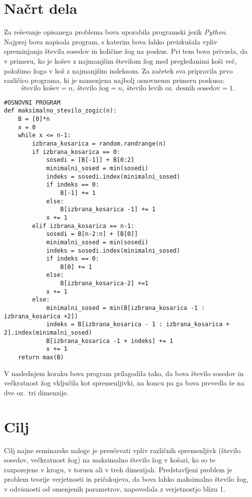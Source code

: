 \documentclass[a4paper, 11pt]{article}
\begin{document}
\section{Načrt dela}
Za reševanje opisanega problema bova uporabila programski jezik \emph{Python}. Najprej bova napisala program, s katerim bova
lahko preizkušala vpliv spreminjanja števila sosedov in količine žog na poskus. Pri tem bova privzela, da v primeru, ko je  
košev z najmanjšim številom žog med pregledanimi koši več, položimo žogo v koš z najmanjšim indeksom. Za začetek sva
pripravila prvo različico programa, ki je namenjena najbolj osnovnemu primeru poskusa:
$$ \text{število košev} = n,\  \text{število žog} = n, \ \text{število levih oz.\ desnih sosedov} = 1 .$$

\pagebreak

\begin{verbatim}
#OSNOVNI PROGRAM
def maksimalno_stevilo_zogic(n):
    B = [0]*n
    x = 0
    while x <= n-1:
        izbrana_kosarica = random.randrange(n)
        if izbrana_kosarica == 0:
            sosedi = [B[-1]] + B[0:2]
            minimalni_sosed = min(sosedi)
            indeks = sosedi.index(minimalni_sosed)
            if indeks == 0:
                B[-1] += 1
            else:
                B[izbrana_kosarica -1] += 1
            x += 1
        elif izbrana_kosarica == n-1:
            sosedi = B[n-2:n] + [B[0]]
            minimalni_sosed = min(sosedi)
            indeks = sosedi.index(minimalni_sosed)
            if indeks == 0:
                B[0] += 1
            else:
                B[izbrana_kosarica-2] +=1
            x += 1
        else:
            minimalni_sosed = min(B[izbrana_kosarica -1 : izbrana_kosarica +2])
            indeks = B[izbrana_kosarica - 1 : izbrana_kosarica + 2].index(minimalni_sosed)
            B[izbrana_kosarica -1 + indeks] += 1
            x += 1
    return max(B)
\end{verbatim}

\noindent V naslednjem koraku bova program prilagodila tako, da bova število sosedov in večkratnost žog vključila kot spremenljivki,
na koncu pa ga bova prevedla še na dve oz.\ tri dimenzije.

\section{Cilj}
Cilj najne seminarske naloge je preučevati vpliv različnih spremenljivk (število sosedov, večkratnost žog) na maksimalno število žog
v košari, ko so te razporejene v krogu, v torusu ali v treh dimezijah. Predstavljeni problem je problem teorije verjetnosti in pričakujeva,
da bova lahko maksimalno število žog, v odvisnosti od omenjenih parametrov, napovedala z verjetnostjo blizu 1.
\end{document}
